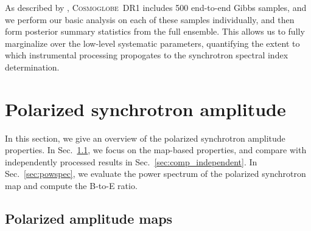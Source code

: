 \documentclass[twocolumn]{../../common/aa}
\def\WMAP{\emph{WMAP}}
\def\Planck{\emph{Planck}}
\newcommand{\cosmoglobe}{\textsc{Cosmoglobe}}
\newcommand{\K}[0]{\textit K}
\begin{document}
As described by \citet{watts2023_dr1}, \cosmoglobe\ DR1 includes 500 end-to-end Gibbs samples, and we perform our basic analysis on each of these samples individually, and then form posterior summary statistics from the full ensemble. This allows us to fully marginalize over the low-level systematic parameters, quantifying the extent to which instrumental processing propogates to the synchrotron spectral index determination.


\section{Polarized synchrotron amplitude}
\label{sec:pol_amp}

In this section, we give an overview of the polarized synchrotron amplitude properties. In Sec.~\ref{sec:pol_amp_map}, we focus on the map-based properties, and compare with independently processed results in Sec.~\ref{sec:comp_independent}. In Sec.~\ref{sec:powspec},  we evaluate the power spectrum of the polarized synchrotron map and compute the B-to-E ratio.

\subsection{Polarized amplitude maps}
\label{sec:pol_amp_map}



\end{document}
